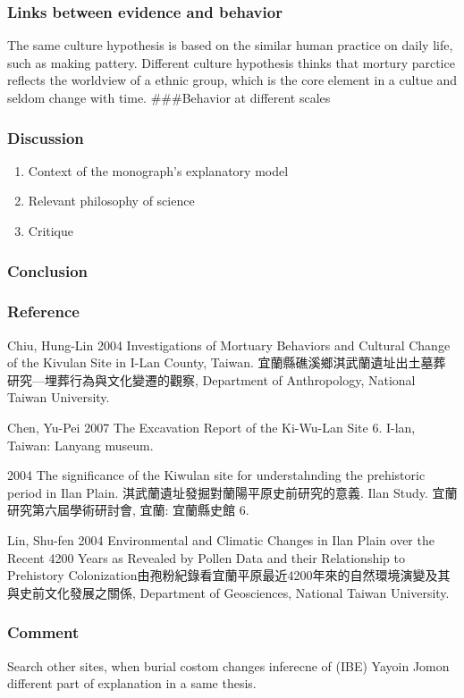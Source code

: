 \documentclass[10pt]{article}
\begin{document}
\subsubsection{Links between evidence and
behavior}\label{links-between-evidence-and-behavior}

The same culture hypothesis is based on the similar human practice on
daily life, such as making pattery. Different culture hypothesis thinks
that mortury parctice reflects the worldview of a ethnic group, which is
the core element in a cultue and seldom change with time. \#\#\#Behavior
at different scales

\subsubsection{Discussion}\label{discussion}

\begin{enumerate}
\def\labelenumi{\arabic{enumi}.}
\itemsep1pt\parskip0pt
\item
  Context of the monograph's explanatory model
\item
  Relevant philosophy of science
\item
  Critique
\end{enumerate}

\subsubsection{Conclusion}\label{conclusion}

\subsubsection{Reference}\label{reference}

Chiu, Hung-Lin 2004 Investigations of Mortuary Behaviors and Cultural
Change of the Kivulan Site in I-Lan County, Taiwan.
宜蘭縣礁溪鄉淇武蘭遺址出土墓葬研究---埋葬行為與文化變遷的觀察,
Department of Anthropology, National Taiwan University.

Chen, Yu-Pei 2007 The Excavation Report of the Ki-Wu-Lan Site 6. I-lan,
Taiwan: Lanyang museum.

2004 The significance of the Kiwulan site for understahnding the
prehistoric period in Ilan Plain.
淇武蘭遺址發掘對蘭陽平原史前研究的意義. Ilan Study.
宜蘭研究第六屆學術研討會, 宜蘭: 宜蘭縣史館 6.

Lin, Shu-fen 2004 Environmental and Climatic Changes in Ilan Plain over
the Recent 4200 Years as Revealed by Pollen Data and their Relationship
to Prehistory
Colonization由孢粉紀錄看宜蘭平原最近4200年來的自然環境演變及其與史前文化發展之關係,
Department of Geosciences, National Taiwan University.

\subsubsection{Comment}\label{comment}

Search other sites, when burial costom changes inferecne of (IBE) Yayoin
Jomon different part of explanation in a same thesis.
\end{document}
